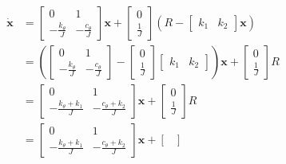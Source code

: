 \begin{equation}
    \begin{split}
        \dot{\textbf{x}} &= 
        \begin{bmatrix}
            0 & 1 \\
            -\frac{k_{\theta}}{J} & -\frac{c_{\theta}}{J}
        \end{bmatrix}
        \textbf{x} + 
        \begin{bmatrix}
            0\\
            \frac{1}{J}
        \end{bmatrix}
        \left(R - \begin{bmatrix} k_1 & k_2 \end{bmatrix}
        \textbf{x}
        \right) \\
        &= 
        \left(\begin{bmatrix}
            0 & 1 \\
            -\frac{k_{\theta}}{J} & -\frac{c_{\theta}}{J}
        \end{bmatrix} - \begin{bmatrix}
            0\\
            \frac{1}{J}
        \end{bmatrix}\begin{bmatrix}
            k_1 & k_2
        \end{bmatrix}\right)
        \textbf{x} + 
        \begin{bmatrix}
            0\\
            \frac{1}{J}
        \end{bmatrix}R
        \\
        &= 
        \begin{bmatrix}
            0 & 1 \\
            -\frac{k_{\theta} + k_1}{J}& -\frac{c_{\theta} +k_2}{J}
        \end{bmatrix}
        \textbf{x} + 
        \begin{bmatrix}
            0\\
            \frac{1}{J}
        \end{bmatrix}R\\
        &= 
        \begin{bmatrix}
            0 & 1 \\
            -\frac{k_{\theta} + k_1}{J}& -\frac{c_{\theta} +k_2}{J}
        \end{bmatrix}
        \textbf{x} + 
        \begin{bmatrix}

\end{bmatrix}
\end{split}
\end{equation}
